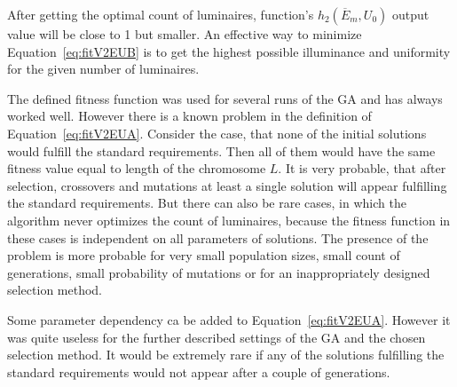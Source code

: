 After getting the optimal count of luminaires, function's $h_2\left(\overline{E}_{m}, U_0\right)$ output value will be close to 1 but smaller. An effective way to minimize Equation~\ref{eq:fitV2EUB} is to get the highest possible illuminance and uniformity for the given number of luminaires.

The defined fitness function was used for several runs of the GA and has always worked well. However there is a known problem in the definition of Equation~\ref{eq:fitV2EUA}. Consider the case, that none of the initial solutions would fulfill the standard requirements. Then all of them would have the same  fitness value equal to length of the chromosome $L$. It is very probable, that after selection, crossovers and mutations at least a single solution will appear fulfilling the standard requirements. But there can also be rare cases, in which the algorithm never optimizes the count of luminaires, because the fitness function in these cases is independent on all parameters of solutions. The presence of the problem is more probable for very small population sizes, small count of generations, small probability of mutations or for an inappropriately designed selection method.

Some parameter dependency ca be added to Equation~\ref{eq:fitV2EUA}. However it was quite useless for the further described settings of the GA and the chosen selection method. It would be extremely rare if any of the solutions fulfilling the standard requirements would not appear after a couple of generations.
